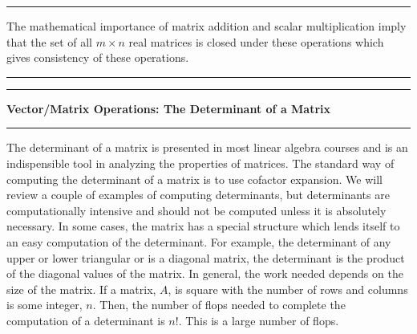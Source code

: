 \documentclass[10pt,fleqn]{article}
\begin{document}
\vskip0.1in\hrule\vskip0.1in
\noindent
The mathematical importance of matrix addition and scalar multiplication imply
that the set of all $m\times n$ real matrices is closed under these operations
which gives consistency of these operations.
\vskip0.1in\hrule\vskip0.1in
\newpage
\vskip0.1in\hrule\vskip0.1in
\noindent
{\bf Vector/Matrix Operations: The Determinant of a Matrix}
\vskip0.1in\hrule\vskip0.1in
\noindent
The determinant of a matrix is presented in most linear algebra courses and is
an indispensible tool in analyzing the properties of matrices. The standard way
of computing the determinant of a matrix is to use cofactor expansion. We will
review a couple of examples of computing determinants, but determinants are
computationally intensive and should not be computed unless it is absolutely
necessary. In some cases, the matrix has a special structure which lends itself
to an easy computation of the determinant. For example, the determinant of any
upper or lower triangular or is a diagonal matrix, the determinant is the
product of the diagonal values of the matrix. In general, the work needed
depends on the size of the matrix. If a matrix, $A$, is square with the number
of rows and columns is some integer, $n$. Then, the number of flops needed to
complete the computation of a determinant is $n!$. This is a large number of
flops.
\end{document}
